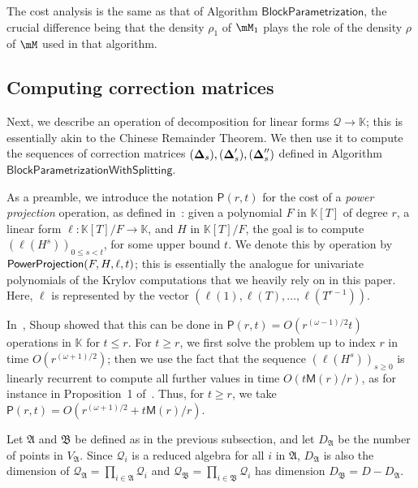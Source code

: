 \documentclass[12pt]{article}
\newcommand{\mat}[1]{\bm{\MakeUppercase{#1}}} %
\newcommand{\mainalgoname}{\mathsf{ BlockParametrization}}
\newcommand{\residueI}{\mathscr{Q}}
\def\M {\ensuremath{\mathsf{M}}}
\def\PP {\ensuremath{\mathsf{P}}}
\def\K{\mathbb{K}}
\def\K {\ensuremath{\mathbb{K}}}
\begin{document}
The cost analysis is the same as that of Algorithm $\mainalgoname$, the
crucial difference being that the density $\rho_1$ of $\mM_1$ plays the 
role of the density $\rho$ of $\mM$ used in that algorithm.


\subsection{Computing correction matrices}

Next, we describe an operation of decomposition for linear forms
$\residueI \to \K$; this is essentially akin to the Chinese Remainder
Theorem. We then use it to compute the sequences of correction
matrices $(\mat{\Delta}_s),(\mat{\Delta}'_s),(\mat{\Delta}''_s)$
defined in Algorithm $\mathsf{BlockParametrizationWithSplitting}$.

As a preamble, we introduce the notation $\PP(r,t)$ for the cost of a
{\em power projection} operation, as defined
in~\cite{Shoup94,Shoup99}: given a polynomial $F$ in $\K[T]$ of degree
$r$, a linear form $\ell: \K[T]/F \to \K$, and $H$ in $\K[T]/F$, the
goal is to compute $(\ell(H^s))_{0 \le s < t}$, for some upper bound
$t$. We denote this by operation by ${\sf PowerProjection}(F,H,\ell,t)$; this is
essentially the analogue for univariate polynomials of the Krylov
computations that we heavily rely on in this paper. Here, $\ell$ 
is represented by the vector $(\ell(1),\ell(T),\dots,\ell(T^{r-1}))$.

In~\cite[Theorem~4]{Shoup94}, Shoup showed that this can be done in
$\PP(r,t)=O(r^{(\omega-1)/2} t)$ operations in $\K$ for $t \le r$. For
$t \ge r$, we first solve the problem up to index $r$ in time
$O(r^{(\omega+1)/2})$; then we use the fact that the sequence 
$(\ell(H^s))_{s \ge 0}$
 is linearly recurrent to compute all further values in time
$O(t\M(r)/r)$, as for instance in Proposition~1 of~\cite{BoFlSaSc06}.
Thus, for $t \ge r$, we take $\PP(r,t)=O(r^{(\omega+1)/2} +
t\M(r)/r)$.

\medskip

Let $\mathfrak{A}$ and $\mathfrak{B}$ be defined as in the previous 
subsection, and let $D_{\mathfrak{A}}$ be the number of points in
$V_{\mathfrak{A}}$. Since $\residueI_i$ is a reduced algebra for all
$i$ in $\mathfrak{A}$, $D_\mathfrak{A}$ is also the dimension of
$\residueI_\mathfrak{A} = \prod_{i \in \mathfrak{A}}
\residueI_i$ and $\residueI_\mathfrak{B}=\prod_{i \in \mathfrak{B}}
\residueI_i$ has dimension $D_{\mathfrak{B}}=D-D_{\mathfrak{A}}$.
\end{document}
